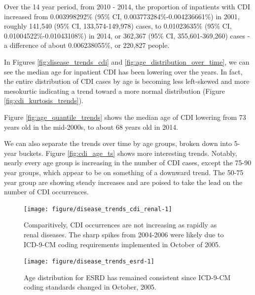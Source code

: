 \documentclass[12pt]{ociamthesis}\usepackage[]{graphicx}\usepackage[]{color}
\newenvironment{knitrout}{}{} %
\newcommand{\ci}[3]{#1 (95\% CI, #2-#3)}
\newcommand{\cip}[3]{#1\% (95\% CI, #2\%-#3\%)}
\begin{document}
Over the 14 year period, from 2010 - 2014, the proportion of inpatients with CDI increased from 
\cip{0.003998292}{0.003773284}{0.004236661} in 2001, roughly 
\ci{141,540}{133,574}{149,978} cases, to
\cip{0.01023635}{0.01004522}{0.01043108} in 2014, or
\ci{362,367}{355,601}{369,260} cases - 
a difference of about 0.006238055\%, or 220,827 people. 

In Figures \ref{fig:disease_trends_cdi} and \ref{fig:age_distribution_over_time}, we can see the median age for inpatient CDI has been lowering over the years.
In fact, the entire distribution of CDI cases by age is becoming less left-skewed and more mesokurtic indicating a trend toward a more normal distribution 
(Figure \ref{fig:cdi_kurtosis_trends}). 

Figure \ref{fig:age_quantile_trends} shows the median age of CDI lowering from 73 years old in the mid-2000s, to about 68 years old in 2014. 

We can also separate the trends over time by age groups, broken down into 5-year buckets. Figure \ref{fig:cdi_age_ts} shows more interesting trends.
Notably, nearly every age group is increasing in the number of CDI cases, except the 75-90 year groups, which appear to be on something of a downward trend.
The 50-75 year group are showing steady increases and are poised to take the lead on the number of CDI occurrences. 


\begin{knitrout}
\color{fgcolor}\begin{figure}

{\centering \texttt{[image: figure/disease\_trends\_cdi\_renal-1]} 

}

\caption[Comparitively, CDI occurrences are not increasing as rapidly as renal diseases]{Comparitively, CDI occurrences are not increasing as rapidly as renal diseases. The sharp spikes from 2004-2006 were likely due to ICD-9-CM coding requirements implemented in October of 2005.}\label{fig:disease_trends_cdi_renal}
\end{figure}


\end{knitrout}
\label{fig:disease_trends_cdi_renal}



\begin{knitrout}
\color{fgcolor}\begin{figure}

{\centering \texttt{[image: figure/disease\_trends\_esrd-1]} 

}

\caption[Age distribution for ESRD has remained consistent since ICD-9-CM coding standards changed in October, 2005]{Age distribution for ESRD has remained consistent since ICD-9-CM coding standards changed in October, 2005.}\label{fig:disease_trends_esrd}
\end{figure}


\end{knitrout}
\label{fig:disease_trends_esrd}
\end{document}
